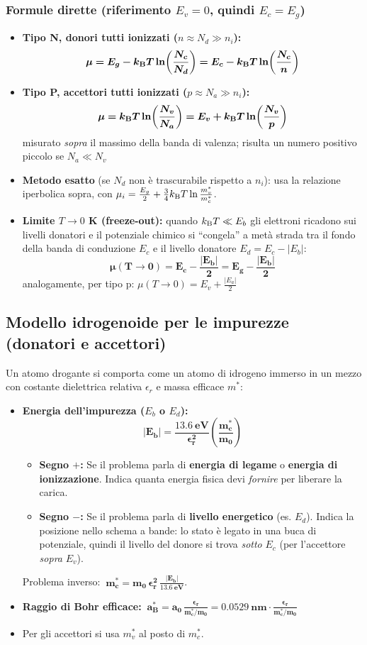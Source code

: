 \subsubsection*{Formule dirette (riferimento $E_v=0$, quindi $E_c=E_g$)}
\begin{itemize}
    \item \textbf{Tipo N, donori tutti ionizzati ($n\approx N_d\gg n_i$):}
    \[ \bm{\mu = E_g - k_{\mathrm{B}} T\ln\!\left(\frac{N_c}{N_d}\right) = E_c - k_{\mathrm{B}} T\ln\!\left(\frac{N_c}{n}\right)} \]
    \item \textbf{Tipo P, accettori tutti ionizzati ($p\approx N_a\gg n_i$):}
    \[ \bm{\mu = k_{\mathrm{B}} T\ln\!\left(\frac{N_v}{N_a}\right) = E_v + k_{\mathrm{B}} T\ln\!\left(\frac{N_v}{p}\right)} \]
    misurato \emph{sopra} il massimo della banda di valenza; risulta un numero positivo piccolo se $N_a\ll N_v$
    \item \textbf{Metodo esatto} (se $N_d$ non è trascurabile rispetto a $n_i$): usa la relazione iperbolica sopra, con
    $\mu_i = \frac{E_g}{2}+\frac34k_{\mathrm{B}} T\ln\frac{m_v^*}{m_c^*}$.
    \item \textbf{Limite $T\to0$ K (freeze-out):} quando $k_{\mathrm{B}} T\ll E_b$ gli elettroni ricadono sui livelli donatori e il potenziale chimico si ``congela'' a metà strada tra il fondo della banda di conduzione $E_c$ e il livello donatore $E_d=E_c-|E_b|$:
    \[ \bm{\mu(T\to0) = E_c - \frac{|E_b|}{2} = E_g - \frac{|E_b|}{2}} \]
    analogamente, per tipo p: $\mu(T\to0) = E_v + \frac{|E_a|}{2}$
\end{itemize}

\subsection{Modello idrogenoide per le impurezze (donatori e accettori)}
Un atomo drogante si comporta come un atomo di idrogeno immerso in un mezzo con costante dielettrica relativa $\epsilon_r$ e massa efficace $m^*$:
\begin{itemize}
    \item \textbf{Energia dell'impurezza ($E_b$ o $E_d$):} 
    \[\bm{|E_b| = \frac{13.6\ \text{eV}}{\epsilon_r^2}\left(\frac{m_c^*}{m_0}\right)}\]
    \begin{itemize}
        \item \textbf{Segno $+$:} Se il problema parla di \textbf{energia di legame} o \textbf{energia di ionizzazione}. Indica quanta energia fisica devi \emph{fornire} per liberare la carica.
        \item \textbf{Segno $-$:} Se il problema parla di \textbf{livello energetico} (es. $E_d$). Indica la posizione nello schema a bande: lo stato è legato in una buca di potenziale, quindi il livello del donore si trova \emph{sotto} $E_c$ (per l'accettore \emph{sopra} $E_v$).
    \end{itemize}
    Problema inverso: $\ \bm{m_c^* = m_0\,\epsilon_r^2\,\frac{|E_b|}{13.6\ \text{eV}}}$.
    \item \textbf{Raggio di Bohr efficace:} $\ \bm{a_B^* = a_0\,\frac{\epsilon_r}{m_c^*/m_0} = 0.0529\ \text{nm}\cdot\frac{\epsilon_r}{m_c^*/m_0}}$
    \item Per gli accettori si usa $m_v^*$ al posto di $m_c^*$.
\end{itemize}


